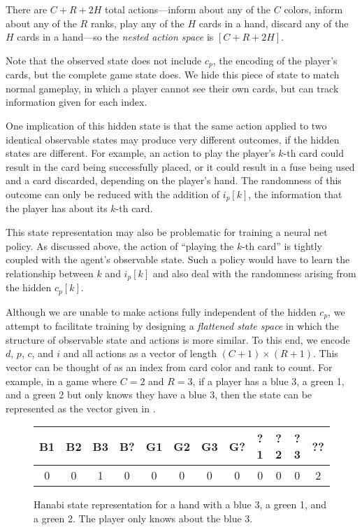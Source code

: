 There are $C + R + 2H$ total actions---inform about any of the $C$ colors,
inform about any of the $R$ ranks, play any of the $H$ cards in a hand, discard
any of the $H$ cards in a hand---so the \emph{nested action space} is $[C + R +
2H]$.

Note that the observed state does not include $c_p$, the encoding of the
player's cards, but the complete game state does. We hide this piece of state
to match normal gameplay, in which a player cannot see their own cards, but can
track information given for each index.

One implication of this hidden state is that the same action applied to two
identical observable states may produce very different outcomes, if the hidden
states are different. For example, an action to play the player's $k$-th card
could result in the card being successfully placed, or it could result in a
fuse being used and a card discarded, depending on the player's hand. The
randomness of this outcome can only be reduced with the addition of $i_p[k]$, the
information that the player has about its $k$-th card.

This state representation may also be problematic for training a neural net
policy. As discussed above, the action of ``playing the $k$-th card'' is
tightly coupled with the agent's observable state. Such a policy would have to
learn the relationship between $k$ and $i_p[k]$ and also deal with the
randomness arising from the hidden $c_p[k]$.

Although we are unable to make actions fully independent of the hidden $c_p$,
we attempt to facilitate training by designing a \emph{flattened state space}
in which the structure of observable state and actions is more similar. To this
end, we encode $d$, $p$, $c$, and $i$ and all actions as a vector of length $(C
+ 1) \times (R + 1)$. This vector can be thought of as an index from card color
and rank to count. For example, in a game where $C = 2$ and $R = 3$, if a
player has a blue 3, a green 1, and a green 2 but only knows they have a blue
3, then the state can be represented as the vector given in
.

\begin{figure}[ht]
    \centering
    \begin{tabular}{c|c|c|c|c|c|c|c|c|c|c|c}
        B1 & B2 & B3 & B? & G1 & G2 & G3 & G? & ?1 & ?2 & ?3 & ?? \\\hline
        0  & 0  & 1  & 0  & 0  & 0  & 0  & 0  & 0  & 0  & 0  & 2
    \end{tabular}
    \caption{%
      Hanabi state representation for a hand with a blue 3, a green 1, and a
      green 2. The player only knows about the blue 3.
    }\label{fig:flattenedstate}
\end{figure}

